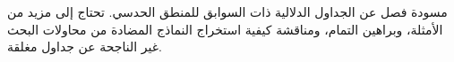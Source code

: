 \documentclass[../../../include/open-logic-chapter]{subfiles}
\begin{document}

\begin{editorial}
  مسودة فصل عن الجداول الدلالية ذات السوابق للمنطق الحدسي. تحتاج إلى مزيد
  من الأمثلة، وبراهين التمام، ومناقشة كيفية استخراج النماذج المضادة من
  محاولات البحث غير الناجحة عن جداول مغلقة.
\end{editorial}


\OLEndChapterHook
\end{document}
